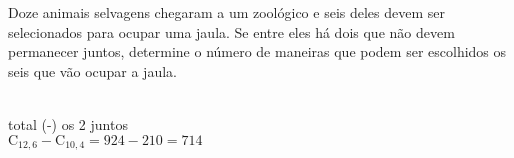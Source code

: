 \begin{ex}
 Doze animais selvagens chegaram a um zoológico e seis deles devem ser selecionados para ocupar uma jaula. Se entre eles há dois que não devem permanecer juntos, determine o número de maneiras que podem ser escolhidos os seis que vão ocupar a jaula.
   \begin{sol}
   \phantom{A} \\
   total (-) os 2 juntos \\
    $\mathrm{C}_{{12},6}-\mathrm{C}_{{10},4}=924-210=714$
    
   \end{sol}
\end{ex}